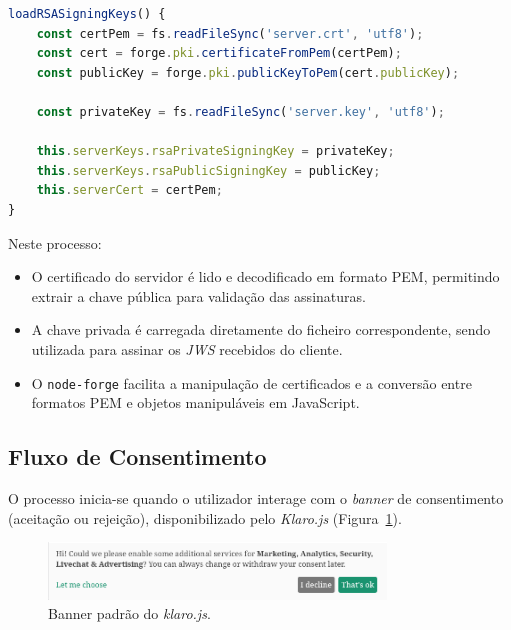 \begin{lstlisting}[language=Javascript, caption={Carregamento das chaves RSA do servidor e do certificado associado}, label={lst:server-rsa-key-load}]
loadRSASigningKeys() {
	const certPem = fs.readFileSync('server.crt', 'utf8');
	const cert = forge.pki.certificateFromPem(certPem);
	const publicKey = forge.pki.publicKeyToPem(cert.publicKey);

	const privateKey = fs.readFileSync('server.key', 'utf8');

	this.serverKeys.rsaPrivateSigningKey = privateKey;
	this.serverKeys.rsaPublicSigningKey = publicKey;
	this.serverCert = certPem;
}
\end{lstlisting}

Neste processo:
\begin{itemize}
    \item O certificado do servidor é lido e decodificado em formato PEM, permitindo extrair a chave pública para validação das assinaturas.
    \item A chave privada é carregada diretamente do ficheiro correspondente, sendo utilizada para assinar os \textit{JWS} recebidos do cliente.
    \item O \texttt{node-forge} facilita a manipulação de certificados e a conversão entre formatos PEM e objetos manipuláveis em JavaScript.
\end{itemize}

\subsection{Fluxo de Consentimento}

O processo inicia-se quando o utilizador interage com o \textit{banner} de consentimento (aceitação ou rejeição), disponibilizado pelo \textit{Klaro.js} (Figura~\ref{fig:klarojs-banner}).

\begin{figure}[h]
    \centering
	\includegraphics[width=0.8\textwidth]{images/klaro_banner.png}
	\caption{Banner padrão do \textit{klaro.js}.}
\label{fig:klarojs-banner}
\end{figure}

